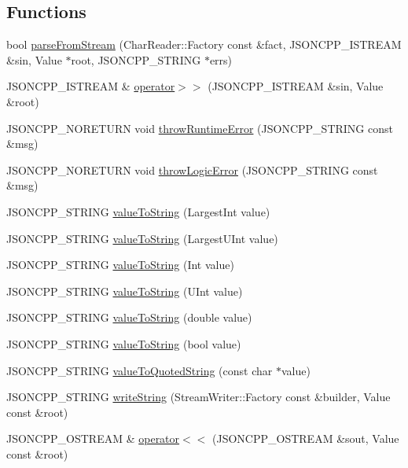 \subsection*{Functions}
\begin{DoxyCompactItemize}
\item 
bool \hyperlink{namespaceJson_a38f903cfdb57a6c4e86a7dcc42f3712c}{parse\-From\-Stream} (Char\-Reader\-::\-Factory const \&fact, J\-S\-O\-N\-C\-P\-P\-\_\-\-I\-S\-T\-R\-E\-A\-M \&sin, Value $\ast$root, J\-S\-O\-N\-C\-P\-P\-\_\-\-S\-T\-R\-I\-N\-G $\ast$errs)
\item 
J\-S\-O\-N\-C\-P\-P\-\_\-\-I\-S\-T\-R\-E\-A\-M \& \hyperlink{namespaceJson_a52b40333cc8aa17c82ac359462ce691b}{operator$>$$>$} (J\-S\-O\-N\-C\-P\-P\-\_\-\-I\-S\-T\-R\-E\-A\-M \&sin, Value \&root)
\item 
J\-S\-O\-N\-C\-P\-P\-\_\-\-N\-O\-R\-E\-T\-U\-R\-N void \hyperlink{namespaceJson_a0ab7ff7f99788262d92d9ff3d924e065}{throw\-Runtime\-Error} (J\-S\-O\-N\-C\-P\-P\-\_\-\-S\-T\-R\-I\-N\-G const \&msg)
\item 
J\-S\-O\-N\-C\-P\-P\-\_\-\-N\-O\-R\-E\-T\-U\-R\-N void \hyperlink{namespaceJson_a27790f21f17922fac81e7cd72a5659a5}{throw\-Logic\-Error} (J\-S\-O\-N\-C\-P\-P\-\_\-\-S\-T\-R\-I\-N\-G const \&msg)
\item 
J\-S\-O\-N\-C\-P\-P\-\_\-\-S\-T\-R\-I\-N\-G \hyperlink{namespaceJson_a4732517cb28d203cfd4354d05952a81b}{value\-To\-String} (Largest\-Int value)
\item 
J\-S\-O\-N\-C\-P\-P\-\_\-\-S\-T\-R\-I\-N\-G \hyperlink{namespaceJson_a6283ea3db02efe9104ae6baff698245a}{value\-To\-String} (Largest\-U\-Int value)
\item 
J\-S\-O\-N\-C\-P\-P\-\_\-\-S\-T\-R\-I\-N\-G \hyperlink{namespaceJson_a498503e8f49d6a3811e3c9f6757da60d}{value\-To\-String} (Int value)
\item 
J\-S\-O\-N\-C\-P\-P\-\_\-\-S\-T\-R\-I\-N\-G \hyperlink{namespaceJson_ab2cb54f173193c8d27c3eb7f10b6e79a}{value\-To\-String} (U\-Int value)
\item 
J\-S\-O\-N\-C\-P\-P\-\_\-\-S\-T\-R\-I\-N\-G \hyperlink{namespaceJson_a3cf0c8dbbdb898c4a6fad54670b34bd1}{value\-To\-String} (double value)
\item 
J\-S\-O\-N\-C\-P\-P\-\_\-\-S\-T\-R\-I\-N\-G \hyperlink{namespaceJson_a0a706a1fffba4fe8a8c1ef75b2dbbfab}{value\-To\-String} (bool value)
\item 
J\-S\-O\-N\-C\-P\-P\-\_\-\-S\-T\-R\-I\-N\-G \hyperlink{namespaceJson_aaf777a6923bcb4cf63a2729973fe5315}{value\-To\-Quoted\-String} (const char $\ast$value)
\item 
J\-S\-O\-N\-C\-P\-P\-\_\-\-S\-T\-R\-I\-N\-G \hyperlink{namespaceJson_a2fedf74e669b85f356f2c00973172ce7}{write\-String} (Stream\-Writer\-::\-Factory const \&builder, Value const \&root)
\item 
J\-S\-O\-N\-C\-P\-P\-\_\-\-O\-S\-T\-R\-E\-A\-M \& \hyperlink{namespaceJson_a0f440d134f8bab9725aa31cb9704d6af}{operator$<$$<$} (J\-S\-O\-N\-C\-P\-P\-\_\-\-O\-S\-T\-R\-E\-A\-M \&sout, Value const \&root)
\end{DoxyCompactItemize}


